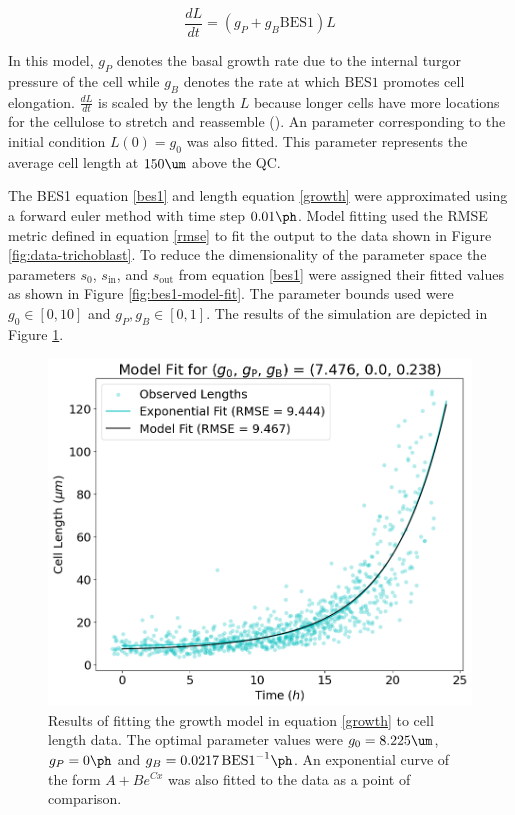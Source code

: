 \begin{equation}
\label{growth}
\frac{dL}{dt} = (g_{P} + g_{B}\text{BES1})L
\end{equation}

In this model, $g_{P}$ denotes the basal growth rate due to the internal turgor pressure of the cell while $g_{B}$ denotes the rate at which $\text{BES1}$ promotes cell elongation. $\frac{dL}{dt}$ is scaled by the length $L$ because longer cells have more locations for the cellulose to stretch and reassemble (\cite{smithers2024}). An parameter corresponding to the initial condition $L(0) = g_{0}$ was also fitted. This parameter represents the average cell length at $150\um$ above the QC. 

\medskip

The BES1 equation \eqref{bes1} and length equation \eqref{growth} were approximated using a forward euler method with time step $0.01\ph$. Model fitting used the RMSE metric defined in equation \eqref{rmse} to fit the output to the data shown in Figure \ref{fig:data-trichoblast}. To reduce the dimensionality of the parameter space the parameters $s_{0}$, $s_{\text{in}}$, and $s_{\text{out}}$ from equation \eqref{bes1} were assigned their fitted values as shown in Figure \ref{fig:bes1-model-fit}. The parameter bounds used were $g_{0} \in [0, 10]$ and $g_{P}, g_{B} \in [0, 1]$. The results of the simulation are depicted in Figure \ref{fig:growth-model-fit}.

\begin{figure}[!hbt]
    \centering
    \includegraphics[width=13cm]{img/growth-model-fit.png}
    \caption{Results of fitting the growth model in equation \eqref{growth} to cell length data. The optimal parameter values were $g_{0} = 8.225\um$, $g_{P} = 0 \ph$ and $g_{B} = 0.0217\,\text{BES1}^{-1}\ph$. An exponential curve of the form $A + Be^{Cx}$ was also fitted to the data as a point of comparison. }
    \label{fig:growth-model-fit}
\end{figure}

